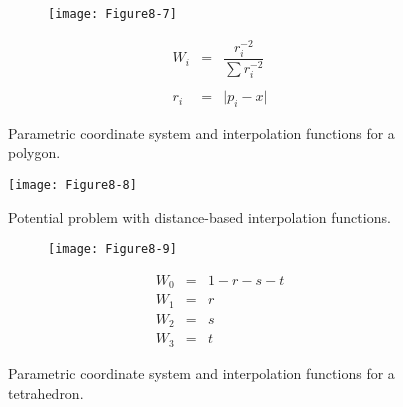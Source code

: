 \begin{description}
    \begin{figure}[!htb]
        \centering
        \begin{subfigure}{0.48\linewidth}
            \centering
            \texttt{[image: Figure8-7]}
            \caption*{}
        \end{subfigure}
        \hfill
        \begin{subfigure}{0.48\linewidth}
            \centering
            \begin{equation*}
            \begin{array}{lll}
            W_i &=& \dfrac{r_i^{-2}}{\sum r_i^{-2}} \\ \\
            r_i &=& \vert p_i - x \vert
            \end{array}
            \end{equation*}
        \end{subfigure}%
        \caption{Parametric coordinate system and interpolation functions for a polygon.}
        \label{fig:Figure8-7}
    \end{figure}

    \begin{figure}[!htb]
        \centering
        \texttt{[image: Figure8-8]}\\
        \caption{Potential problem with distance-based interpolation functions.}\label{fig:Figure8-8}
    \end{figure}

    \begin{figure}[!htb]
        \centering
        \begin{subfigure}{0.48\linewidth}
            \centering
            \texttt{[image: Figure8-9]}
            \caption*{}
        \end{subfigure}
        \hfill
        \begin{subfigure}{0.48\linewidth}
            \centering
            \begin{equation*}
            \begin{array}{lll}
            W_0 &=& 1 - r - s - t \\
            W_1 &=& r \\
            W_2 &=& s \\
            W_3 &=& t
            \end{array}
            \end{equation*}
        \end{subfigure}%
        \caption{Parametric coordinate system and interpolation functions for a tetrahedron.}
        \label{fig:Figure8-9}
    \end{figure}


\end{description}
